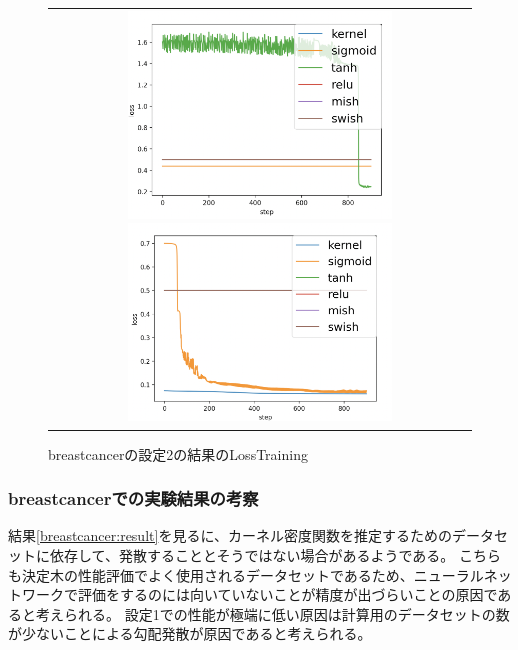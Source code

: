 \begin{figure}[hbtp]
    \begin{center}
        \begin{tabular}{c}
            \begin{minipage}{0.5\hsize}
                \includegraphics[clip, width=7cm]{asset/breastcancer_0.001_1000_3_005_sgd_non_kaiming_uniform}
                    \caption{breastcancerの設定1の結果のLossTraining}
                    \label{breastcancer_1}
            \end{minipage}
            \hspace{10pt}
            \begin{minipage}{0.5\hsize}
                \includegraphics[clip, width=7cm]{asset/breastcancer_0.001_1000_3_05_sgd_non_kaiming_uniform}
                    \caption{breastcancerの設定2の結果のLossTraining}
                    \label{breastcancer_2}
            \end{minipage}
        \end{tabular}
    \end{center}
\end{figure}


\subsubsection{breastcancerでの実験結果の考察}
結果\ref{breastcancer:result}を見るに、カーネル密度関数を推定するためのデータセットに依存して、発散することとそうではない場合があるようである。
こちらも決定木の性能評価でよく使用されるデータセットであるため、ニューラルネットワークで評価をするのには向いていないことが精度が出づらいことの原因であると考えられる。
設定1での性能が極端に低い原因は計算用のデータセットの数が少ないことによる勾配発散が原因であると考えられる。

